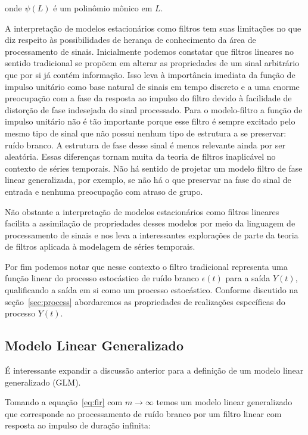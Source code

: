 onde $\psi(L)$ é um polinômio mônico em $L$.

A interpretação de modelos estacionários como filtros tem suas limitações no
que diz respeito às possibilidades de herança de conhecimento da área de
processamento de sinais. Inicialmente podemos constatar que filtros lineares no
sentido tradicional se propõem em alterar as propriedades de um sinal
arbitrário que por si já contém informação. Isso leva à importância imediata da
função de impulso unitário como base natural de sinais em tempo discreto e a
uma enorme preocupação com a fase da resposta ao impulso do filtro devido à
facilidade de distorção de fase indesejada do sinal processado. Para o
modelo-filtro a função de impulso unitário não é tão importante porque esse
filtro é sempre excitado pelo mesmo tipo de sinal que não possui nenhum tipo de
estrutura a se preservar: ruído branco. A estrutura de fase desse sinal é menos
relevante ainda por ser aleatória. Essas diferenças tornam muita da teoria de
filtros inaplicável no contexto de séries temporais. Não há sentido de projetar
um modelo filtro de fase linear generalizada, por exemplo, se não há o que
preservar na fase do sinal de entrada e nenhuma preocupação com atraso de grupo.

Não obstante a interpretação de modelos estacionários como filtros lineares
facilita a assimilação de propriedades desses modelos por meio da linguagem de
processamento de sinais e nos leva a interessantes explorações de parte da
teoria de filtros aplicada à modelagem de séries temporais.

Por fim podemos notar que nesse contexto o filtro tradicional representa uma
função linear do processo estocástico de ruído branco ${\epsilon(t)}$ para a
saída ${Y(t)}$, qualificando a saída em si como um processo estocástico.
Conforme discutido na seção~\ref{sec:process} abordaremos as propriedades de
realizações específicas do processo ${Y(t)}$.

\subsection{Modelo Linear Generalizado}
\label{sec:glm}

É interessante expandir a discussão anterior para a definição de um modelo
linear generalizado (GLM).

Tomando a equação~\ref{eq:fir} com $m \rightarrow \infty$ temos um modelo linear
generalizado que corresponde ao processamento de ruído branco por um filtro
linear com resposta ao impulso de duração infinita:

